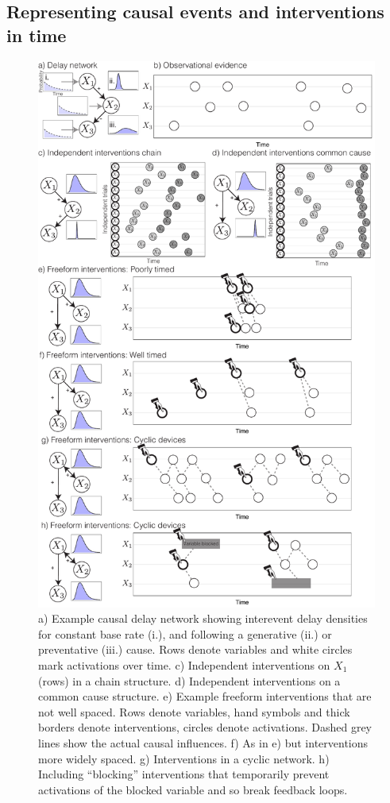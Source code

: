\documentclass{cambridge7A}%
\begin{document}
\subsection{Representing causal events and interventions in time}


\begin{figure}[h!]
   \centering
   \includegraphics[width = .78\columnwidth]{DN}
   \caption{\scriptsize{a) Example causal delay network showing interevent delay densities for constant base rate (i.), and following a generative (ii.) or preventative (iii.) cause.  Rows denote variables and white circles mark activations over time.  c) Independent interventions on $X_1$ (rows) in a chain structure. d) Independent interventions on a common cause structure.  
   e) Example freeform interventions that are not well spaced.   Rows denote variables, hand symbols and thick borders denote interventions, circles denote activations.  Dashed grey lines show the actual causal influences.  f) As in e) but interventions more widely spaced.  g) Interventions in a cyclic network. h) Including ``blocking'' interventions that temporarily prevent activations of the blocked variable and so break feedback loops.}}
   \label{fig:DN}
\end{figure}
\end{document}
